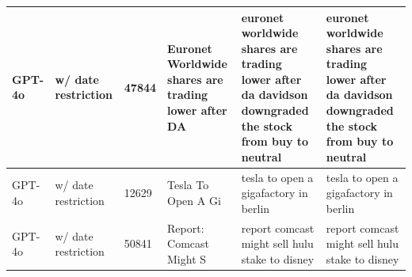 \begin{table}[!h]
\begin{tabular}[t]{
p{1.4cm}
p{1.4cm}
p{1.4cm}
p{3.2cm}
p{3.2cm}
p{3.2cm}
}
GPT-4o & w/ date restriction & 47844 & Euronet Worldwide shares are trading lower after DA & euronet worldwide shares are trading lower after da davidson downgraded the stock from buy to neutral & euronet worldwide shares are trading lower after da davidson downgraded the stock from buy to neutral\\
\midrule
GPT-4o & w/ date restriction & 12629 & Tesla To Open A Gi & tesla to open a gigafactory in berlin & tesla to open a gigafactory in berlin\\
\midrule
GPT-4o & w/ date restriction & 50841 & Report: Comcast Might S & report comcast might sell hulu stake to disney & report comcast might sell hulu stake to disney\\
\bottomrule
\end{tabular}
\end{table}
